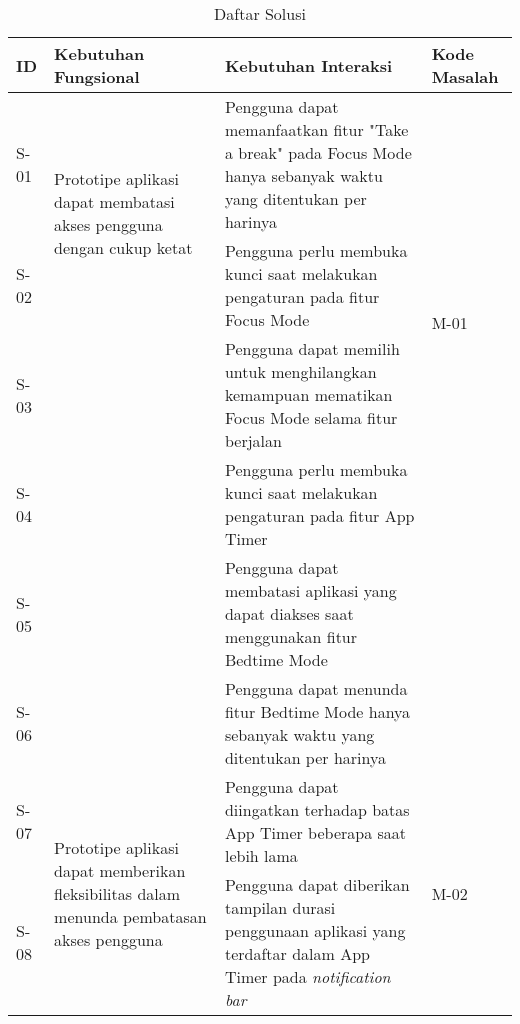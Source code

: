 \begin{longtable}[c]{|p{}|p{}|p{}|p{}|}
  \caption{Daftar Solusi}
  \label{tab:daftar_solusi} \\

  \hline
  ID  & Kebutuhan Fungsional & Kebutuhan Interaksi & Kode Masalah \\ \hline \endhead

  \hline \endfoot

  S-01
  & \multirow{2}{0.3\textwidth}{Prototipe aplikasi dapat membatasi akses pengguna dengan cukup ketat}
  & Pengguna dapat memanfaatkan fitur "Take a break" pada Focus Mode hanya sebanyak waktu yang ditentukan per harinya
  & \multirow{4}{0.1\textwidth}{M-01} \\ \cline{1-1} \cline{3-3}
  
  S-02 &  
  & Pengguna perlu membuka kunci saat melakukan pengaturan pada fitur Focus Mode
  & \\ \cline{1-1} \cline{3-3}
  
  S-03 &  
  & Pengguna dapat memilih untuk menghilangkan kemampuan mematikan Focus Mode selama fitur berjalan
  & \\ \cline{1-1} \cline{3-3}
  
  S-04 &  
  & Pengguna perlu membuka kunci saat melakukan pengaturan pada fitur App Timer
  & \\ \cline{1-1} \cline{3-3}
  
  S-05 &  
  & Pengguna dapat membatasi aplikasi yang dapat diakses saat menggunakan fitur Bedtime Mode
  & \\ \cline{1-1} \cline{3-3}
  
  S-06 &  
  & Pengguna dapat menunda fitur Bedtime Mode hanya sebanyak waktu yang ditentukan per harinya
  
  & \\ \hline
  S-07
  & \multirow{3}{0.3\textwidth}{Prototipe aplikasi dapat memberikan fleksibilitas dalam menunda pembatasan akses pengguna}
  & Pengguna dapat diingatkan terhadap batas App Timer beberapa saat lebih lama
  & \multirow{2}{0.1\textwidth}{M-02} \\ \cline{1-1} \cline{3-3}
  
  S-08 &  
  & Pengguna dapat diberikan tampilan durasi penggunaan aplikasi yang terdaftar dalam App Timer pada \textit{notification bar}
  & \\ \cline{1-1} \cline{3-3}
  

\end{longtable}
